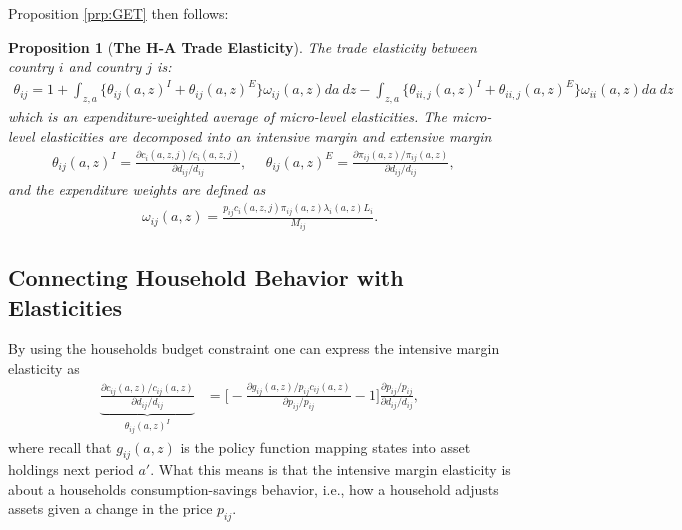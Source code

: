 \documentclass[12pt,pdftex]{article}
\newtheorem{prp}{Proposition}
\begin{document}
\begin{onehalfspacing}
Proposition \ref{prp:GET} then follows:

\setcounter{prp}{2}
\begin{prp}[\textbf{The H-A Trade Elasticity}]The trade elasticity between country $i$ and country $j$ is:
{\footnotesize
\begin{align}
\theta_{ij} = 1 + \int_{z,a} \bigg \{ \theta_{ij}(a,z)^{I} + \theta_{ij}(a,z)^{E} \bigg \}\omega_{ij}(a,z)da \ dz - \int_{z,a} \bigg \{ \theta_{ii,j}(a,z)^{I} + \theta_{ii,j}(a,z)^{E} \bigg \}\omega_{ii}(a,z)da \ dz
\label{eq:trade-elasticity}
\end{align}
}which is an expenditure-weighted average of micro-level elasticities. The micro-level elasticities are decomposed into an intensive margin and extensive margin
{\footnotesize
\begin{align}
\nonumber
\theta_{ij}(a,z)^{I} = \frac{\partial c_{i}(a,z,j)/ c_{i}(a,z,j)}{\partial d_{ij} / d_{ij}}, \ \ \ \ \ \ \theta_{ij}(a,z)^{E} = \frac{\partial \pi_{ij}(a,z) / \pi_{ij}(a,z)}{\partial d_{ij} / d_{ij}}, \ \ \ \
\end{align}
}
and the expenditure weights are defined as
{\footnotesize
\begin{align}
\nonumber
\omega_{ij}(a,z) = \frac{p_{ij}c_{i}(a,z,j)\pi_{ij}(a,z) \lambda_{i}(a,z) L_i}{M_{ij}}.
\end{align}
}
\end{prp}

\subsection{Connecting Household Behavior with Elasticities}


By using the households budget constraint one can express the intensive margin elasticity as
\begin{align}
\underbrace{\frac{\partial c_{ij}(a,z)/ c_{ij}(a,z)}{\partial d_{ij} / d_{ij}}}_{\theta_{ij}(a,z)^{I}} &= \bigg [-\frac{\partial g_{ij}(a,z)/ p_{ij}c_{ij}(a,z)}{\partial p_{ij}/ p_{ij}} - 1 \bigg ]\frac{\partial p_{ij}/p_{ij}}{\partial d_{ij}/ d_{ij}} ,
\label{eq:apx-intensive-margin}
\end{align}
where recall that $g_{ij}(a,z)$ is the policy function mapping states into asset holdings next period $a'$. What this means is that the intensive margin elasticity is about a households consumption-savings behavior, i.e., how a household adjusts assets given a change in the price $p_{ij}$.


\end{onehalfspacing}
\end{document}
